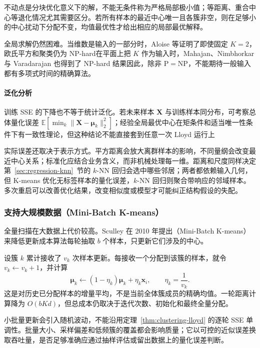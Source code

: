 不动点是分块优化意义下的解，不能无条件称为严格局部极小值；等距离、重合中心等退化情况尤其需要区分。若所有样本的最近中心唯一且各簇非空，则在足够小的中心扰动下分配不变，均值最优性才给出相应的局部最优解释。

全局求解仍然困难。当维数是输入的一部分时，Aloise 等证明了即使固定 $K=2$，欧氏平方和聚类仍为 NP-hard在平面上把 $K$ 作为输入时，Mahajan、Nimbhorkar 与 Varadarajan 也得到了 NP-hard 结果因此，除非 $\mathrm{P}=\mathrm{NP}$，不能期待一般输入都有多项式时间的精确算法。

\paragraph{泛化分析}
训练 SSE 的下降也不等于统计泛化。若未来样本 $\bm{X}$ 与训练样本同分布，可考察总体量化误差 $\mathbb{E}[\min_k\lVert\bm{X}-\bm{\mu}_k\rVert_2^2]$；经验全局最优中心在矩条件和适当唯一性条件下有一致性理论，但这种结论不能直接套到任意一次 Lloyd 运行上

实际误差还取决于表示方式。平方距离会放大离群样本的影响，不同量纲会改变最近中心关系；标准化应结合业务含义，而非机械处理每一维。距离和尺度同样决定第~\ref{sec:regression-knn}~节的 $k$-NN 回归会选中哪些邻居；两者都依赖输入几何，但 K-means 优化无标签样本的量化误差，$k$-NN 回归则聚合带响应的邻域样本。多次重启可以改善优化结果，改变相似度或模型才可能纠正结构假设的失配。

\subsubsection{支持大规模数据（Mini-Batch K-means）}

全量扫描在大数据上代价较高。Sculley 在 2010 年提出（Mini-Batch K-means）来降低更新成本算法每轮抽取 $b$ 个样本，只更新它们涉及的中心。

设簇 $k$ 累计接收了 $v_k$ 次样本更新。每接收一个分配到该簇的样本，就令 $v_k\leftarrow v_k+1$，并计算
\begin{equation}
 \bm{\mu}_k\leftarrow
 (1-\eta_k)\bm{\mu}_k+\eta_k\bm{x}_i,
 \qquad \eta_k=\frac{1}{v_k}.
 \label{eq:clustering-minibatch}
\end{equation}
这是对历史已分配样本的增量平均，不是当前全体簇成员的精确均值。一轮距离计算降为 $O(bKd)$，但总成本仍取决于迭代次数、初始化和最终全量分配。

小批量更新会引入随机波动，不能沿用定理~\ref{thm:clustering-lloyd} 的逐轮 SSE 单调性。批量大小、采样偏差和低频簇的覆盖都会影响质量；它以可控的近似误差换取吞吐量，是否足够准确应通过抽样评估或留出数据上的量化误差判断。

